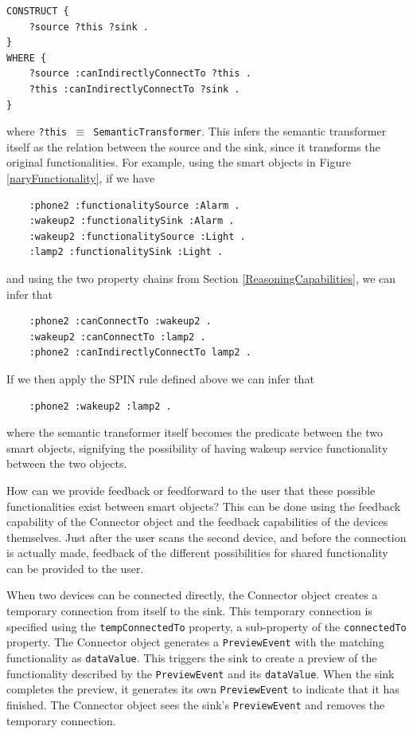 \begin{verbatim}
CONSTRUCT {
    ?source ?this ?sink .
}
WHERE {
    ?source :canIndirectlyConnectTo ?this .
    ?this :canIndirectlyConnectTo ?sink .
}
\end{verbatim}

where \texttt{?this \ensuremath{\equiv} SemanticTransformer}. This infers the semantic transformer itself as the relation between the source and the sink, since it transforms the original functionalities. For example, using the smart objects in Figure \ref{naryFunctionality}, if we have 

\begin{verbatim}
	:phone2 :functionalitySource :Alarm .
	:wakeup2 :functionalitySink :Alarm .
	:wakeup2 :functionalitySource :Light .
	:lamp2 :functionalitySink :Light .
\end{verbatim}

and using the two property chains from Section \ref{ReasoningCapabilities}, we can infer that

\begin{verbatim}
	:phone2 :canConnectTo :wakeup2 .
	:wakeup2 :canConnectTo :lamp2 .
	:phone2 :canIndirectlyConnectTo lamp2 .
\end{verbatim}

If we then apply the \ac{SPIN} rule defined above we can infer that 

\begin{verbatim}
	:phone2 :wakeup2 :lamp2 .
\end{verbatim}

where the semantic transformer itself becomes the predicate between the two smart objects, signifying the possibility of having wakeup service functionality between the two objects.


How can we provide feedback or feedforward to the user that these possible functionalities exist between smart objects? This can be done using the feedback capability of the Connector object and the feedback capabilities of the devices themselves. Just after the user scans the second device, and before the connection is actually made, feedback of the different possibilities for shared functionality can be provided to the user. 

When two devices can be connected directly, the Connector object creates a temporary connection from itself to the sink. This temporary connection is specified using the \texttt{temp\-Connected\-To} property, a sub-property of the \texttt{connectedTo} property. The Connector object generates a \texttt{PreviewEvent} with the matching functionality as \texttt{dataValue}.  This triggers the sink to create a preview of the functionality described by the \texttt{Preview\-Event} and its \texttt{dataValue}.  When the sink completes the preview, it generates its own \texttt{PreviewEvent} to indicate that it has finished. The Connector object sees the sink's \texttt{PreviewEvent} and removes the temporary connection.

